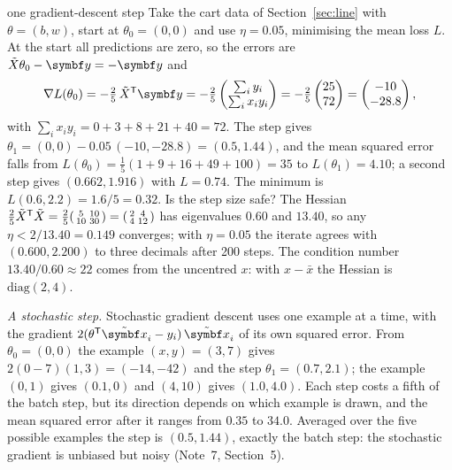 \documentclass[11pt]{article}
\newcommand{\Xt}{\tilde X}
\newcommand{\xt}{\tilde{\x}}
\newcommand{\y}{\vect{y}}
\begin{document}
\begin{worked}{one gradient-descent step}
Take the cart data of Section~\ref{sec:line} with $\theta = (b, w)$, start at $\theta_0 = (0, 0)$ and use
$\eta = 0.05$, minimising the mean loss $L$. At the start all predictions are zero, so the errors are $\Xt\theta_0 - \y = -\y$ and
\[
  \nabla L(\theta_0) = -\tfrac25\,\Xt\T\y = -\tfrac25 \begin{pmatrix} \sum_i y_i \\ \sum_i x_i y_i \end{pmatrix}
  = -\tfrac25\begin{pmatrix} 25 \\ 72 \end{pmatrix} = \begin{pmatrix} -10 \\ -28.8 \end{pmatrix},
\]
with $\sum_i x_i y_i = 0 + 3 + 8 + 21 + 40 = 72$. The step gives $\theta_1 = (0, 0) - 0.05\,(-10, -28.8) = (0.5, 1.44)$,
and the mean squared error falls from $L(\theta_0) = \frac15(1 + 9 + 16 + 49 + 100) = 35$ to $L(\theta_1) = 4.10$; a second
step gives $(0.662, 1.916)$ with $L = 0.74$. The minimum is $L(0.6, 2.2) = 1.6/5 = 0.32$. Is the step size safe? The
Hessian $\frac25\Xt\T\Xt = \frac25\begin{psmallmatrix} 5 & 10 \\ 10 & 30 \end{psmallmatrix} =
\begin{psmallmatrix} 2 & 4 \\ 4 & 12 \end{psmallmatrix}$ has eigenvalues $0.60$ and $13.40$, so any $\eta < 2/13.40 = 0.149$
converges; with $\eta = 0.05$ the iterate agrees with $(0.600, 2.200)$ to three decimals after 200 steps. The condition
number $13.40/0.60 \approx 22$ comes from the uncentred $x$: with $x - \bar x$ the Hessian is $\mathrm{diag}(2, 4)$.

\emph{A stochastic step.} Stochastic gradient descent uses one example at a time, with the gradient
$2(\theta\T\xt_i - y_i)\,\xt_i$ of its own squared error. From $\theta_0 = (0, 0)$ the example $(x, y) = (3, 7)$ gives
$2(0 - 7)(1, 3) = (-14, -42)$ and the step $\theta_1 = (0.7, 2.1)$; the example $(0, 1)$ gives $(0.1, 0)$ and
$(4, 10)$ gives $(1.0, 4.0)$. Each step costs a fifth of the batch step, but its direction depends on which example is
drawn, and the mean squared error after it ranges from $0.35$ to $34.0$. Averaged over the five possible examples the
step is $(0.5, 1.44)$, exactly the batch step: the stochastic gradient is unbiased but noisy (Note~7, Section~5).
\end{worked}
\end{document}
